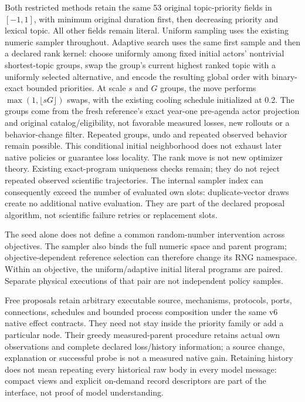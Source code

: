 Both restricted methods retain the same 53 original topic-priority fields in
$[-1,1]$, with minimum original duration first, then decreasing priority and
lexical topic. All other fields remain literal. Uniform sampling uses the
existing numeric sampler throughout. Adaptive search uses the same first
sample and then a declared rank kernel: choose uniformly among fixed initial
actors' nontrivial shortest-topic groups, swap the group's current highest
ranked topic with a uniformly selected alternative, and encode the resulting
global order with binary-exact bounded priorities. At scale $s$ and $G$ groups,
the move performs $\max(1,\lfloor sG\rfloor)$ swaps, with the existing cooling
schedule initialized at 0.2. The groups come from the fresh reference's exact
year-one pre-agenda actor projection and original catalog/eligibility, not
favorable measured losses, new rollouts or a behavior-change filter. Repeated
groups, undo and repeated observed behavior remain possible. This conditional
initial neighborhood does not exhaust later native policies or guarantee loss
locality. The rank move is not new optimizer theory.
Existing exact-program uniqueness checks remain; they do not reject repeated
observed scientific trajectories.
The internal sampler index can consequently exceed the number of evaluated
own slots: duplicate-vector draws create no additional native evaluation.
They are part of the declared proposal algorithm, not scientific failure
retries or replacement slots.

The seed alone does not define a common random-number intervention across
objectives. The sampler also binds the full numeric space and parent program;
objective-dependent reference selection can therefore change its RNG namespace.
Within an objective, the uniform/adaptive initial literal programs are paired.
Separate physical executions of that pair are not independent policy samples.

Free proposals retain arbitrary executable source, mechanisms, protocols,
ports, connections, schedules and bounded process composition under the same
v6 native effect contracts. They need not stay inside the priority family or
add a particular node. Their greedy measured-parent procedure retains actual
own observations and complete declared loss/history information; a source
change, explanation or successful probe is not a measured native gain.
Retaining history does not mean repeating every historical raw body in every
model message: compact views and explicit on-demand record descriptors are
part of the interface, not proof of model understanding.

